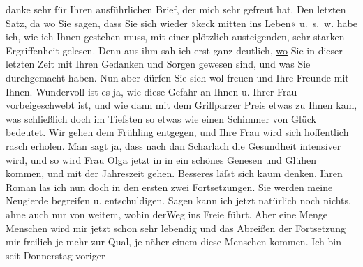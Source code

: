 \begin{ledgroupsized}[t]{13cm}
           danke sehr für Ihren ausführlichen Brief, der mich sehr gefreut hat. Den letzten
               Satz, da wo Sie sagen, dass Sie sich wieder »keck mitten ins Leben« u. s. w. habe
               ich, wie ich Ihnen gestehen muss, mit einer plötzlich austeigenden, sehr starken
               Ergriffenheit gelesen. Denn aus ihm sah ich erst ganz deutlich, \uline{wo} Sie in dieser letzten Zeit mit Ihren Gedanken und Sorgen gewesen
               sind, und was Sie durchgemacht haben. Nun aber dürfen Sie sich wol freuen und Ihre
               Freunde mit Ihnen. Wundervoll ist es ja, wie diese Gefahr an Ihnen u. Ihrer Frau vorbeigeschwebt ist, und
               wie dann mit dem Grillparzer Preis etwas zu Ihnen
               kam, was schließlich doch im Tiefsten so etwas wie einen Schimmer von Glück bedeutet.
               Wir gehen dem Frühling entgegen, und Ihre Frau wird sich hoffentlich rasch erholen. Man sagt ja, dass
               nach dan Scharlach die Gesundheit intensiver wird, und so wird Frau Olga jetzt in in ein schönes Genesen und Glühen kommen, und
               mit der Jahreszeit gehen. Besseres läſst sich kaum denken. Ihren Roman las ich nun doch in den ersten zwei
               Fortsetzungen. Sie werden meine Neugierde begreifen u. entschuldigen. Sagen kann ich
               jetzt natürlich noch nichts, ahne auch nur von weitem, wohin derWeg ins Freie führt. Aber eine Menge Menschen wird mir jetzt
               schon sehr lebendig und das Abreißen der Fortsetzung mir freilich je mehr zur Qual,
               je näher einem diese Menschen kommen.\pend
           \pstart
           {\pb}Ich bin seit Donnerstag voriger

\end{ledgroupsized}
